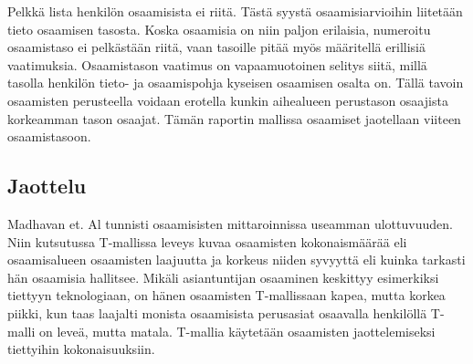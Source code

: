 \documentclass[a4paper,finnish,12pt]{article}
\begin{document}
Pelkkä lista henkilön osaamisista ei riitä. Tästä syystä osaamisiarvioihin liitetään tieto osaamisen tasosta. Koska osaamisia on niin paljon erilaisia, numeroitu osaamistaso ei pelkästään riitä, vaan tasoille pitää myös määritellä erillisiä vaatimuksia. Osaamistason vaatimus on vapaamuotoinen selitys siitä, millä tasolla henkilön tieto- ja osaamispohja kyseisen osaamisen osalta on. Tällä tavoin osaamisten perusteella voidaan erotella kunkin aihealueen perustason osaajista korkeamman tason osaajat. Tämän raportin mallissa osaamiset jaotellaan viiteen osaamistasoon.


\subsection{Jaottelu}

Madhavan et. Al tunnisti osaamisisten mittaroinnissa useamman ulottuvuuden. Niin kutsutussa T-mallissa leveys kuvaa osaamisten kokonaismäärää eli osaamisalueen osaamisten laajuutta ja korkeus niiden syvyyttä eli kuinka tarkasti hän osaamisia hallitsee. Mikäli asiantuntijan osaaminen keskittyy esimerkiksi tiettyyn teknologiaan, on hänen osaamisten T-mallissaan kapea, mutta korkea piikki, kun taas laajalti monista osaamisista perusasiat osaavalla henkilöllä T-malli on leveä, mutta matala. T-mallia käytetään osaamisten jaottelemiseksi tiettyihin kokonaisuuksiin. \cite{ICT-haasteet}
\end{document}
